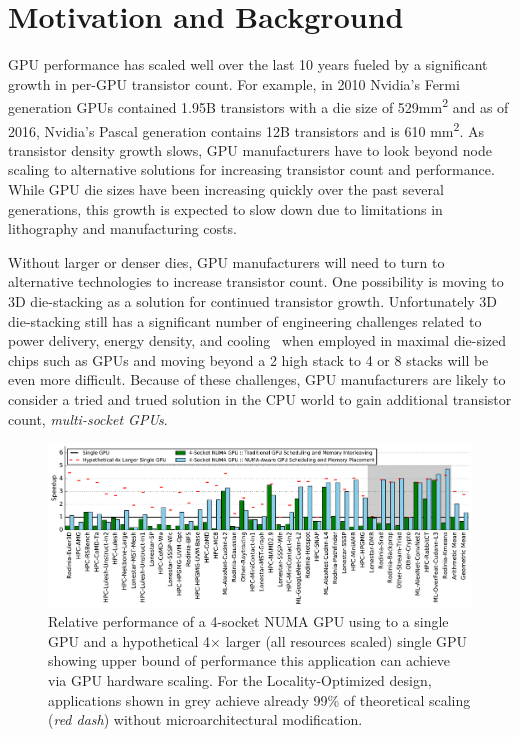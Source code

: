 \section{Motivation and Background}
\label{background}

GPU performance has scaled well over the last 10 years fueled by a significant 
growth in per-GPU transistor count.  For example, in 2010 Nvidia's Fermi 
generation GPUs contained 1.95B transistors with a die size of 
529mm\textsuperscript{2} and as of 2016, Nvidia's Pascal generation contains 
12B transistors and is 610 mm\textsuperscript{2}. As transistor density growth 
slows, GPU manufacturers have to look beyond node scaling to alternative 
solutions for increasing transistor count and performance. While GPU die sizes 
have been increasing quickly over the past several generations, this growth is 
expected to slow down due to limitations in lithography and manufacturing 
costs. 

Without larger or denser dies, GPU manufacturers will need to turn to 
alternative technologies to increase transistor count.  One possibility is 
moving to 3D die-stacking as a solution for continued transistor growth. 
Unfortunately 3D die-stacking still has a significant number of engineering 
challenges related to power delivery, energy density, and 
cooling~\cite{verbree2010cost} when employed in maximal die-sized chips such as 
GPUs and moving beyond a 2 high stack to 4 or 8 stacks will be even more 
difficult. Because of these challenges, GPU manufacturers are likely to 
consider a tried and trued solution in the CPU world to gain additional 
transistor count, 
\textit{multi-socket GPUs}.

\begin{figure}[tp]
    \centering
    \includegraphics[width=1.0\linewidth]{figures/plot_different_baselines.pdf}
    \caption{Relative performance of a 4-socket NUMA GPU using to a single GPU 
and a hypothetical 4$\times$ larger (all resources scaled) single GPU showing 
upper bound of performance this application can achieve via GPU hardware 
scaling. For the Locality-Optimized design, applications shown in grey 
achieve already 99\% of theoretical scaling (\emph{red dash}) without 
microarchitectural modification.}
    \label{fig:motivation}
\end{figure}

